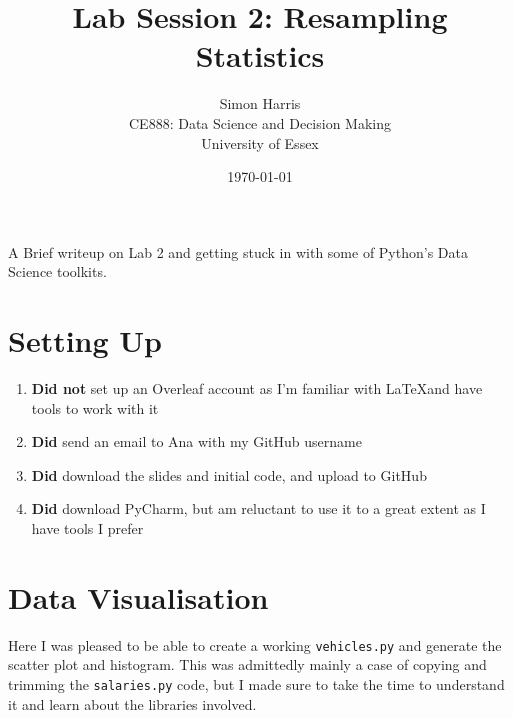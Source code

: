 \documentclass[a4paper]{article}
\begin{document}
\title{Lab Session 2: Resampling Statistics}

\author{Simon Harris \\
 	CE888: Data Science and Decision Making  \\
	University of Essex
}


\date{\today}

\maketitle


A Brief writeup on Lab 2 and getting stuck in with some of Python's Data Science toolkits.


\section{Setting Up}

\begin{enumerate}
\item \textbf{Did not} set up an Overleaf account as I'm familiar with \LaTeX and have tools to work with it
\item \textbf{Did} send an email to Ana with my GitHub username
\item \textbf{Did} download the slides and initial code, and upload to GitHub
\item \textbf{Did} download PyCharm, but am reluctant to use it to a great extent as I have tools I prefer
\end{enumerate}


\section{Data Visualisation}

Here I was pleased to be able to create a working \texttt{vehicles.py} and generate the scatter plot and histogram. This was admittedly mainly a case of copying and trimming the \texttt{salaries.py} code, but I made sure to take the time to understand it and learn about the libraries involved.
\end{document}
